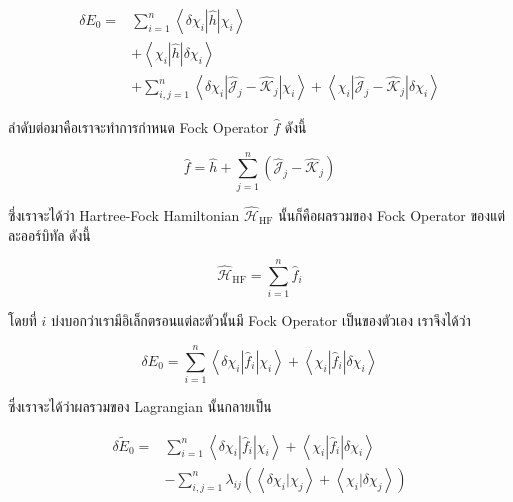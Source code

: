 \begin{equation}
    \begin{aligned}
        \delta E_0
        = & \sum_{i=1}^n\left\langle\delta \chi_i|\hat{h}| \chi_i\right\rangle \\
          & +\left\langle\chi_i|\hat{h}| \delta \chi_i\right\rangle            \\
          & +\sum_{i, j=1}^n
        \left\langle
        \delta \chi_i
        \left|\hat{\mathscr{J}}_j-\hat{\mathscr{K}}_j\right|
        \chi_i
        \right\rangle
        + \left\langle
        \chi_i\left
        |\hat{\mathscr{J}}_j-\hat{\mathscr{K}}_j\right|
        \delta \chi_i
        \right\rangle
    \end{aligned}
\end{equation}

ลำดับต่อมาคือเราจะทำการกำหนด Fock Operator $\hat{f}$ ดังนี้

\begin{equation}
    \label{eq:fock_operator}
    \hat{f}
    = \hat{h}
    + \sum_{j=1}^n
    \left(
    \hat{\mathscr{J}}_j-\hat{\mathscr{K}}_j
    \right)
\end{equation}

\noindent ซึ่งเราจะได้ว่า Hartree-Fock Hamiltonian $\hat{\mathcal{H}}_{\mathrm{HF}}$ นั้นก็คือผลรวมของ Fock Operator
ของแต่ละออร์บิทัล ดังนี้

\begin{equation}
    \label{eq:total_HF_hamiltonian}
    \hat{\mathscr{H}}_{\mathrm{HF}} = \sum_{i=1}^n \hat{f}_i
\end{equation}

\noindent โดยที่ $i$ บ่งบอกว่าเรามีอิเล็กตรอนแต่ละตัวนั้นมี Fock Operator เป็นของตัวเอง เราจึงได้ว่า

\begin{equation}
    \delta E_0
    =
    \sum_{i=1}^n
    \left\langle
    \delta \chi_i\left|\hat{f}_i\right| \chi_i
    \right\rangle
    +
    \left\langle
    \chi_i\left|\hat{f}_i\right| \delta \chi_i
    \right\rangle
\end{equation}

\noindent ซึ่งเราจะได้ว่าผลรวมของ Lagrangian นั้นกลายเป็น

\begin{equation}
    \begin{aligned}
        \delta \tilde{E}_0
        = & \sum_{i=1}^n\left\langle\delta \chi_i\left|\hat{f}_i\right| \chi_i\right\rangle
        +\left\langle\chi_i\left|\hat{f}_i\right| \delta \chi_i\right\rangle                    \\
          & -\sum_{i, j=1}^n \lambda_{i j}\left(\left\langle\delta \chi_i | \chi_j\right\rangle
        + \left\langle\chi_i | \delta \chi_j\right\rangle\right)
    \end{aligned}
\end{equation}

